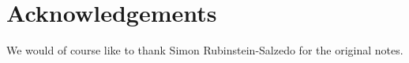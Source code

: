 \section*{Acknowledgements}

We would of course like to thank Simon Rubinstein-Salzedo for the original notes.
